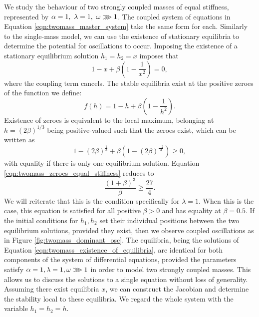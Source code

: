 We study the behaviour of two strongly coupled masses of equal stiffness, represented by \( \alpha = 1,~\lambda = 1,~\omega \gggtr 1\).
The coupled system of equations in Equation \ref{eqn:twomass_master_system} take the same form for each.
Similarly to the single-mass model, we can use the existence of stationary equilibria to determine the potential for oscillations to occur.
Imposing the existence of a stationary equilibrium solution \(h_1 = h_2 = x\) imposes that
\begin{equation}
    1 - x + \beta\left(
        1 - \frac{1}{x^2}
    \right) = 0,
\end{equation}
where the coupling term cancels.
The stable equilibria exist at the positive zeroes of the function we define:
\begin{equation}
    f(h) = 1 - h + \beta \left( 1 - \frac{1}{h^2} \right).
    \label{eqn:twomass_existence_of_equilibria}
\end{equation}
Existence of zeroes is equivalent to the local maximum, belonging at \(h = \left( 2\beta \right)^{1/3}\) being positive-valued such that the zeroes exist,
which can be written as
\begin{equation}
    1 - \left(2\beta\right)^\frac{1}{3} + \beta\left( 1 - (2\beta)^\frac{-2}{3} \right) \ge 0,
    \label{eqn:twomass_zeroes_equal_stiffness}
\end{equation}
with equality if there is only one equilibrium solution.
Equation \ref{eqn:twomass_zeroes_equal_stiffness} reduces to
\begin{equation}
    \frac{(1+\beta)^3}{\beta} \ge \frac{27}{4}.
\end{equation}
We will reiterate that this is the condition specifically for $\lambda=1$.
When this is the case, this equation is satisfied for all positive $\beta>0$ and has equality at $\beta = 0.5$.
If the initial conditions for \(h_1, h_2\) set their individual positions between the two equilibrium solutions,
provided they exist,
then we observe coupled oscillations as in Figure \ref{fig:twomass_dominant_osc}.
The equilibria, being the solutions of Equation \ref{eqn:twomass_existence_of_equilibria}, are identical for both components of the system of differential equations,
provided the parameters satisfy \(\alpha = 1, \lambda = 1, \omega \gggtr 1\) in order to model two strongly coupled masses.
This allows us to discuss the solutions to a single equation without loss of generality.
Assuming there exist equilibria \(x\), 
we can construct the Jacobian and determine the stability local to these equilibria.
We regard the whole system with the variable \(h_1=h_2=h\).
